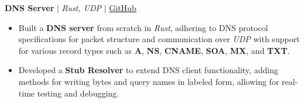 \documentclass[a4paper,11pt]{article}
\newcommand{\resumeItem}[1]{
  \item\small{
    {#1 \vspace{-2pt}}
  }
}
\newcommand{\resumeSubItem}[1]{\resumeItem{#1}\vspace{-4pt}}
\begin{document}
\resumeSubItem{\textbf{DNS Server} $|$ \emph{Rust, UDP}
$|$
\textmd{\href{https://github.com/Akash-Singh04/DNS-Server-Rust}{\underline{GitHub}}}
}
{
\begin{itemize}
\item Built a \textbf{DNS server} from scratch in \textit{Rust}, adhering to DNS protocol specifications for packet structure and communication over \textit{UDP} with support for various record types such as \textbf{A}, \textbf{NS}, \textbf{CNAME}, \textbf{SOA}, \textbf{MX}, and \textbf{TXT}.
\item Developed a \textbf{Stub Resolver} to extend DNS client functionality, adding methods for writing bytes and query names in labeled form, allowing for real-time testing and debugging.
\end{itemize}
}
\end{document}
